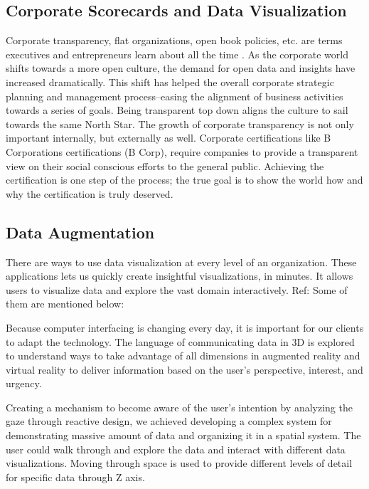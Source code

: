 \documentclass[]{book}
\theoremstyle{definition}
\theoremstyle{definition}
\theoremstyle{definition}
\theoremstyle{remark}
\begin{document}
\subsection{Corporate Scorecards and Data
Visualization}\label{corporate-scorecards-and-data-visualization}

Corporate transparency, flat organizations, open book policies, etc. are
terms executives and entrepreneurs learn about all the time
\citep{SCORECARDS}. As the corporate world shifts towards a more open
culture, the demand for open data and insights have increased
dramatically. This shift has helped the overall corporate strategic
planning and management process--easing the alignment of business
activities towards a series of goals. Being transparent top down aligns
the culture to sail towards the same North Star. The growth of corporate
transparency is not only important internally, but externally as well.
Corporate certifications like B Corporations certifications (B Corp),
require companies to provide a transparent view on their social
conscious efforts to the general public. Achieving the certification is
one step of the process; the true goal is to show the world how and why
the certification is truly deserved.

\subsection{Data Augmentation}\label{data-augmentation}

There are ways to use data visualization at every level of an
organization. These applications lets us quickly create insightful
visualizations, in minutes. It allows users to visualize data and
explore the vast domain interactively. Ref: \citep{app1} Some of them
are mentioned below:

\citep{ref_pdf_ar}

Because computer interfacing is changing every day, it is important for
our clients to adapt the technology. The language of communicating data
in 3D is explored to understand ways to take advantage of all dimensions
in augmented reality and virtual reality to deliver information based on
the user's perspective, interest, and urgency.

Creating a mechanism to become aware of the user's intention by
analyzing the gaze through reactive design, we achieved developing a
complex system for demonstrating massive amount of data and organizing
it in a spatial system. The user could walk through and explore the data
and interact with different data visualizations. Moving through space is
used to provide different levels of detail for specific data through Z
axis.
\end{document}
